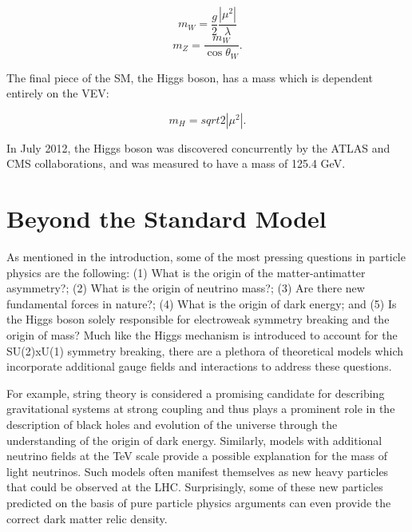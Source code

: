\begin{equation}
m_{W} = \frac{g}{2}\frac{|\mu^{2}|}{\lambda}
\end{equation}
\begin{equation}
m_{Z} = \frac{m_{W}}{\cos{\theta_W}}.
\end{equation}

The final piece of the SM, the Higgs boson, has a mass which is dependent entirely on the VEV:

\begin{equation}
m_H = sqrt{2|\mu^2|}.
\end{equation}

In July 2012, the Higgs boson was discovered concurrently by the ATLAS and CMS collaborations, and was measured to have a mass of 125.4 GeV.~\cite{CMSHiggs}~\cite{ATLASHiggs}

\chapter{Beyond the Standard Model}


As mentioned in the introduction, some of the most pressing questions in particle physics are the following: (1) What is the origin of the matter-antimatter asymmetry?; (2) What is the origin of neutrino mass?; (3) Are there new fundamental forces in nature?; (4) What is the origin of dark energy; and (5) Is the Higgs boson solely responsible for electroweak symmetry breaking and the origin of mass? Much like the Higgs mechanism is introduced to account for the SU(2)xU(1) 
symmetry breaking, there are a plethora of theoretical models which incorporate additional gauge fields and interactions to address these questions. 

For example, string theory is considered a promising candidate for describing gravitational systems at strong coupling and thus plays a prominent role in the description of black holes and evolution of the universe through the understanding of the origin of dark energy. Similarly, models with additional neutrino fields at the TeV scale provide a possible explanation for the mass of light neutrinos. Such models often manifest themselves as new heavy particles that could be observed at the LHC. Surprisingly, some of these new particles predicted on the basis of pure particle physics arguments can even provide the correct dark matter relic density. 

